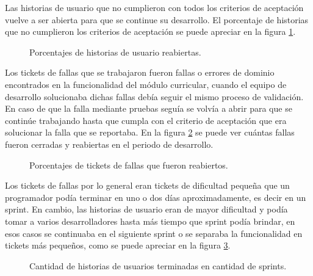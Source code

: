 Las historias de usuario que no cumplieron con todos los criterios de aceptación vuelve a ser abierta para que se continue su desarrollo. El porcentaje de historias que no cumplieron los criterios de aceptación se puede apreciar en la figura \ref{user_story_perc}.

\begin{figure}[H]
\centering
{}
\caption{Porcentajes de historias de usuario reabiertas.}
  \label{user_story_perc}
\end{figure}

Los tickets de fallas que se trabajaron fueron fallas o errores de dominio encontrados en la funcionalidad del módulo curricular, cuando el equipo de desarrollo solucionaba dichas fallas debía seguir el mismo proceso de validación. En caso de que la falla mediante pruebas seguía se volvía a abrir para que se continúe trabajando hasta que cumpla con el criterio de aceptación que era solucionar la falla que se reportaba. En la figura \ref{bugs_perc} se puede ver cuántas fallas fueron cerradas y reabiertas en el periodo de desarrollo.

\begin{figure}[H]
\centering
{}
\caption{Porcentajes de tickets de fallas que fueron reabiertos.}
  \label{bugs_perc}
\end{figure}

Los tickets de fallas por lo general eran tickets de dificultad pequeña que un programador podía terminar en uno o dos días aproximadamente, es decir en un sprint. En cambio, las historias de usuario eran de mayor dificultad y podía tomar a varios desarrolladores hasta más tiempo que sprint podía brindar, en esos casos se continuaba en el siguiente sprint o se separaba la funcionalidad en tickets más pequeños, como se puede apreciar en la figura \ref{sprint_perc}.

\mydata

\begin{figure}[H]
\centering
{}
\caption{Cantidad de historias de usuarios terminadas en cantidad de sprints.}
  \label{sprint_perc}
\end{figure}